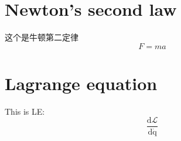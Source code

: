 \documentclass{article}
\begin{document}
\section{Newton's second law}
这个是牛顿第二定律
    $$
    F=ma
    $$

\section{Lagrange equation}
This is LE:
$$
\dfrac{\mathrm{d}\mathcal{L}}{\mathrm{d\dot{q}}}
$$
\end{document}
